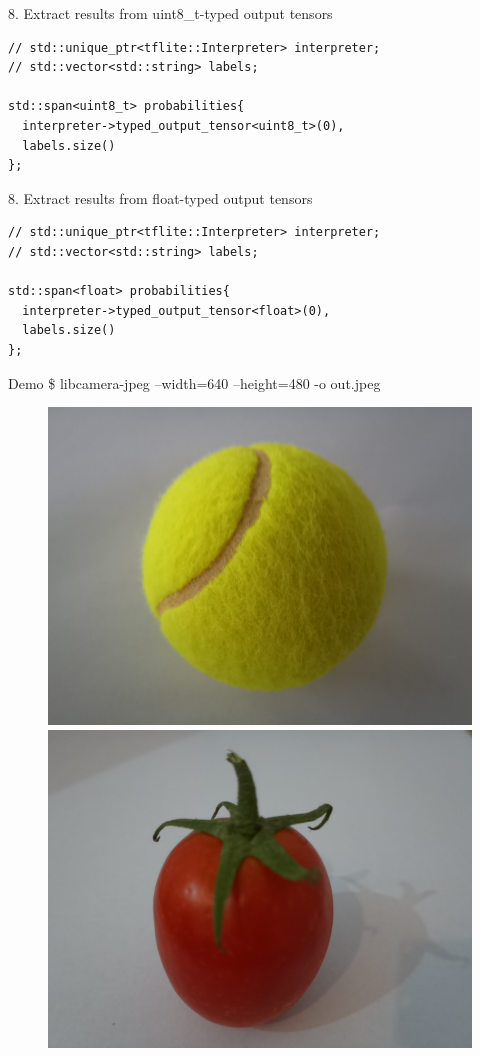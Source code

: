 \begin{frame}[fragile]{8. Extract results from uint8\_t-typed output tensors}
  \lstset{basicstyle=\ttfamily\small, numbers=left, columns=fullflexible}
  \begin{lstlisting}
// std::unique_ptr<tflite::Interpreter> interpreter;
// std::vector<std::string> labels;

std::span<uint8_t> probabilities{
  interpreter->typed_output_tensor<uint8_t>(0),
  labels.size()
};
  \end{lstlisting}
\end{frame}

\begin{frame}[fragile]{8. Extract results from float-typed output tensors}
  \lstset{basicstyle=\ttfamily\small, numbers=left, columns=fullflexible}
  \begin{lstlisting}
// std::unique_ptr<tflite::Interpreter> interpreter;
// std::vector<std::string> labels;

std::span<float> probabilities{
  interpreter->typed_output_tensor<float>(0),
  labels.size()
};
  \end{lstlisting}
\end{frame}

\begin{frame}{Demo}
  \ttfamily \$ libcamera-jpeg --width=640 --height=480 -o out.jpeg
  \begin{figure}
	\includegraphics[width=0.5\linewidth,height=0.5\textheight,keepaspectratio]{../images/tennis_ball_input.jpeg}%
	\includegraphics[width=0.5\linewidth,height=0.5\textheight,keepaspectratio]{images/tomato.jpeg}
  \end{figure}
\end{frame}

